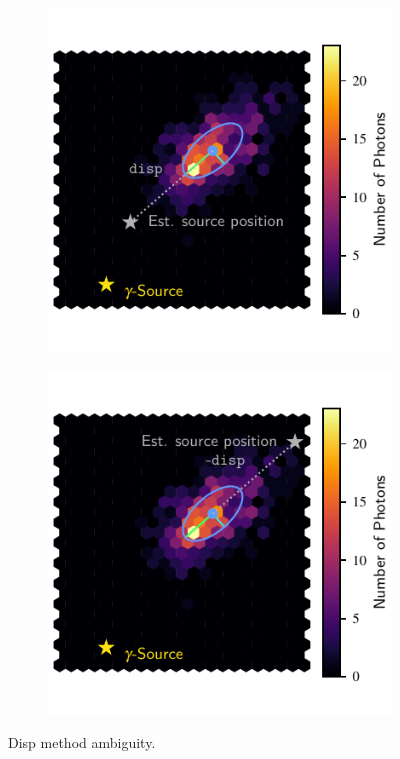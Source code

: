 \begin{figure}
  \begin{subfigure}{0.5\textwidth}
    \includegraphics[width=\textwidth]{Plots/hillas_4.pdf}
  \end{subfigure}
  \begin{subfigure}{0.5\textwidth}
    \includegraphics[width=\textwidth]{Plots/hillas_5.pdf}
  \end{subfigure}
  \caption{Disp method ambiguity.}
  \label{fig:disp_amb}
\end{figure}

